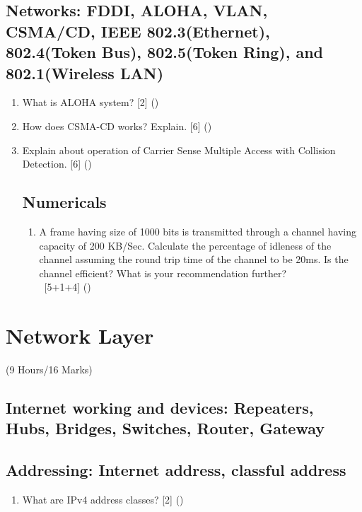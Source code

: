 \documentclass[12pt]{article}
\newcommand{\enter}{\\\textcolor{white}{1}}
\begin{document}
\subsection{Networks: FDDI, ALOHA, VLAN, CSMA/CD, IEEE 802.3(Ethernet), 802.4(Token Bus), 802.5(Token Ring), and 802.1(Wireless LAN)}
\begin{enumerate}[noitemsep, topsep=0pt]
	\item What is ALOHA system? \hfill [2] ()
	
	\item How does CSMA-CD works? Explain. \hfill [6] ()
	
	\item Explain about operation of Carrier Sense Multiple Access with Collision Detection. \hfill [6] ()
	
\subsection{Numericals}
\begin{enumerate}[noitemsep, topsep=0pt]
	\item A frame having size of 1000 bits is transmitted through a channel having capacity of 200 KB/Sec. Calculate the percentage of idleness of the channel assuming the round trip time of the channel to be 20ms. Is the channel efficient? What is your recommendation further?
	\enter\hfill [5+1+4] ()
\end{enumerate}
\end{enumerate}

\pagebreak
\section{Network Layer}
\begin{center}(9 Hours/16 Marks)\end{center}
\subsection{Internet working and devices: Repeaters, Hubs, Bridges, Switches, Router, Gateway}
\subsection{Addressing: Internet address, classful address}
\begin{enumerate}[noitemsep, topsep=0pt]
	\item What are IPv4 address classes? \hfill [2] ()
\end{enumerate}
\end{document}
